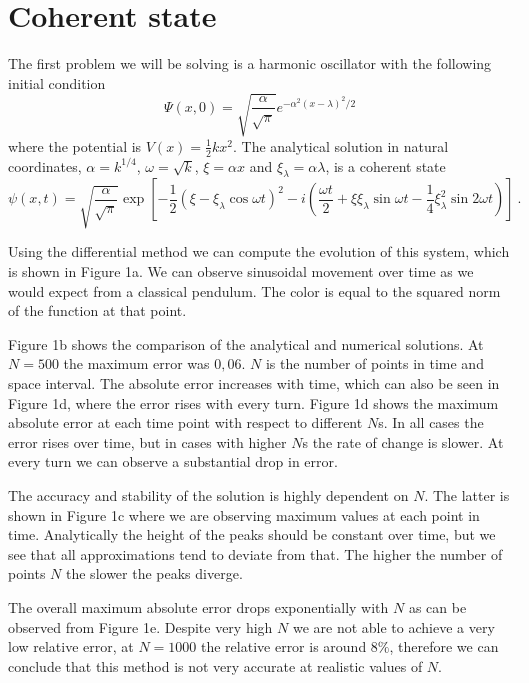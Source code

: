 \documentclass[12pt, a4paper]{article}
\begin{document}
\section{Coherent state}

The first problem we will be solving is a harmonic oscillator with the following initial condition
\begin{equation*}
  \Psi(x,0)=\sqrt{\frac{\alpha}{\sqrt{\pi}}} e^{-\alpha^2 (x-\lambda)^2/2}
\end{equation*}
where the potential is $V(x) = \frac{1}{2} k x ^2$. The analytical solution in natural coordinates, $\alpha = k^{1/4}$, $\omega = \sqrt{k}$, $\xi = \alpha x$ and $\xi_\lambda = \alpha \lambda$, is a coherent state
\begin{equation*}
  \psi(x,t)=\sqrt{\frac{\alpha}{\sqrt{\pi}}} \exp\left[-\frac12 \left(\xi-\xi_\lambda \cos\omega t\right)^2 - i \left(\frac{\omega t}{2}+\xi\xi_\lambda \sin\omega t - \frac14 \xi_\lambda^2 \sin 2 \omega t\right)\right]\>.
\end{equation*}

Using the differential method we can compute the evolution of this system, which is shown in Figure 1a. We can observe sinusoidal movement over time as we would expect from a classical pendulum. The color is equal to the squared norm of the function at that point.

Figure 1b shows the comparison of the analytical and numerical solutions. At $N = 500$ the maximum error was $0,06$. $N$ is the number of points in time and space interval. The absolute error increases with time, which can also be seen in Figure 1d, where the error rises with every turn. Figure 1d shows the maximum absolute error at each time point with respect to different $N$s. In all cases the error rises over time, but in cases with higher $N$s the rate of change is slower. At every turn we can observe a substantial drop in error.

The accuracy and stability of the solution is highly dependent on $N$. The latter is shown in Figure 1c where we are observing maximum values at each point in time. Analytically the height of the peaks should be constant over time, but we see that all approximations tend to deviate from that. The higher the number of points $N$ the slower the peaks diverge. 

The overall maximum absolute error drops exponentially with $N$ as can be observed from Figure 1e. Despite very high $N$ we are not able to achieve a very low relative error, at $N = 1000$ the relative error is around $8 \%$, therefore we can conclude that this method is not very accurate at realistic values of $N$.
\end{document}
